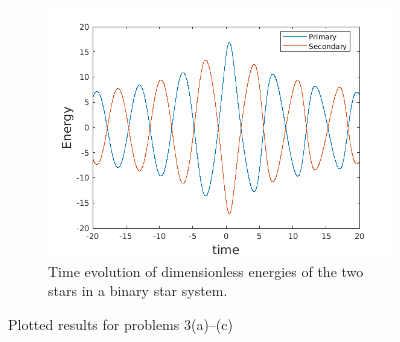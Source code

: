 \documentclass[a4paper]{article}
\begin{document}
\begin{figure} [h]
				\begin{subfigure} {\columnwidth}
					\centering
					\includegraphics[width=.5\columnwidth]{../plots/3c_energy.png}
					\caption{Time evolution of dimensionless energies of the two stars in a binary star system.}
					\label{fig:3c}
				\end{subfigure}
				\caption{Plotted results for problems 3(a)--(c)}
				\label{fig:3.1}
			\end{figure}
			
			
			
\end{document}

